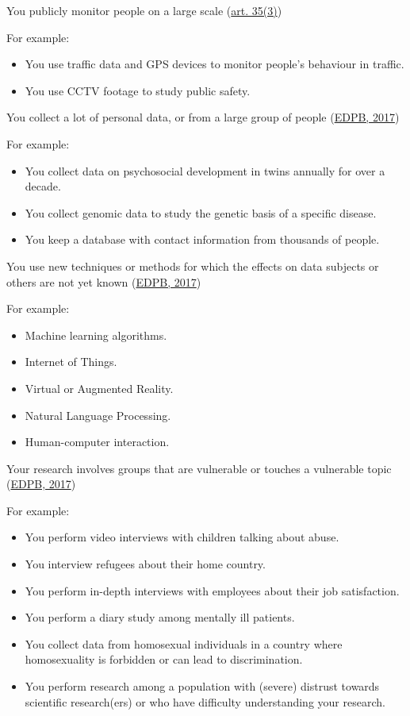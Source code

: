 \documentclass[
]{book}
\providecommand{\tightlist}{%
  \setlength{\itemsep}{0pt}\setlength{\parskip}{0pt}}
\begin{document}
You publicly monitor people on a large scale
(\href{https://gdpr-info.eu/art-35-gdpr/}{art. 35(3)})

For example:

\begin{itemize}
\tightlist
\item
  You use traffic data and GPS devices to monitor people's behaviour in traffic.
\item
  You use CCTV footage to study public safety.
\end{itemize}

You collect a lot of personal data, or from a large group
of people
(\href{https://ec.europa.eu/newsroom/article29/items/611236/en}{EDPB, 2017})

For example:

\begin{itemize}
\tightlist
\item
  You collect data on psychosocial development in twins annually for over a decade.
\item
  You collect genomic data to study the genetic basis of a specific disease.
\item
  You keep a database with contact information from thousands of people.
\end{itemize}

You use new techniques or methods for which the effects on
data subjects or others are not yet known
(\href{https://ec.europa.eu/newsroom/article29/items/611236/en}{EDPB, 2017})

For example:

\begin{itemize}
\tightlist
\item
  Machine learning algorithms.
\item
  Internet of Things.
\item
  Virtual or Augmented Reality.
\item
  Natural Language Processing.
\item
  Human-computer interaction.
\end{itemize}

Your research involves groups that are vulnerable or touches
a vulnerable topic
(\href{https://ec.europa.eu/newsroom/article29/items/611236/en}{EDPB, 2017})

For example:

\begin{itemize}
\tightlist
\item
  You perform video interviews with children talking about abuse.
\item
  You interview refugees about their home country.
\item
  You perform in-depth interviews with employees about their job satisfaction.
\item
  You perform a diary study among mentally ill patients.
\item
  You collect data from homosexual individuals in a country where
  homosexuality is forbidden or can lead to discrimination.
\item
  You perform research among a population with (severe) distrust towards
  scientific research(ers) or who have difficulty understanding your research.
\end{itemize}
\end{document}
